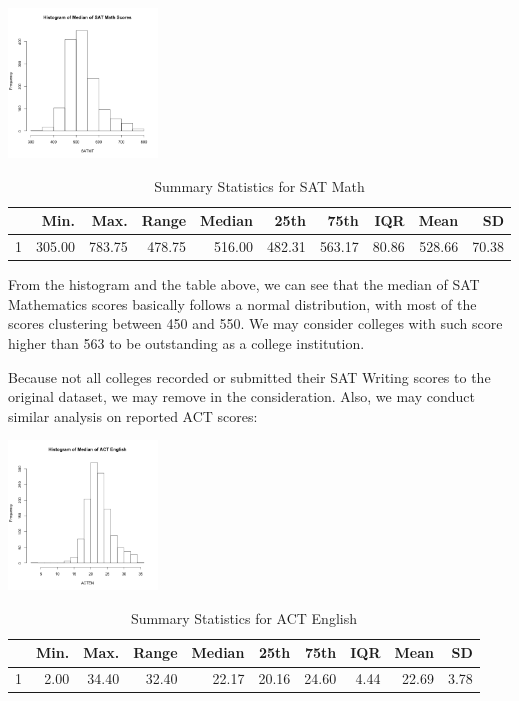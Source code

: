 \documentclass{article}\usepackage[]{graphicx}\usepackage[]{color}
\begin{document}
{\centering \includegraphics[width=150px]{../images/histogram-SATMTMedian} 

}


\begin{table}[ht]
\centering
\begin{tabular}{rrrrrrrrrr}
  \hline
 & Min. & Max. & Range & Median & 25th & 75th & IQR & Mean & SD \\ 
  \hline
1 & 305.00 & 783.75 & 478.75 & 516.00 & 482.31 & 563.17 & 80.86 & 528.66 & 70.38 \\ 
   \hline
\end{tabular}
\caption{Summary Statistics for SAT Math} 
\end{table}


From the histogram and the table above, we can see that the median of SAT Mathematics scores basically follows a normal distribution, with most of the scores clustering between 450 and 550. We may consider colleges with such score higher than 563 to be outstanding as a college institution.

Because not all colleges recorded or submitted their SAT Writing scores to the original dataset, we may remove in the consideration. Also, we may conduct similar analysis on reported ACT scores:



{\centering \includegraphics[width=150px]{../images/histogram-ACTENMedian} 

}


\begin{table}[ht]
\centering
\begin{tabular}{rrrrrrrrrr}
  \hline
 & Min. & Max. & Range & Median & 25th & 75th & IQR & Mean & SD \\ 
  \hline
1 & 2.00 & 34.40 & 32.40 & 22.17 & 20.16 & 24.60 & 4.44 & 22.69 & 3.78 \\ 
   \hline
\end{tabular}
\caption{Summary Statistics for ACT English} 
\end{table}
\end{document}
